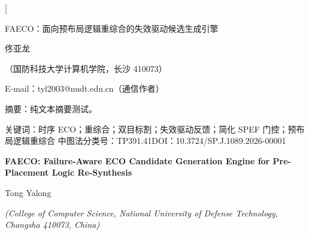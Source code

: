 \documentclass[twocolumn,10pt]{ctexart}
\begin{document}
\twocolumn[
\begin{center}
{\heiti{} FAECO：面向预布局逻辑重综合的失效驱动候选生成引擎}\par
\vspace{6pt}
{\fangsong{} 佟亚龙}\par
\vspace{4pt}
{\songti\fontsize{8}{12}\selectfont（国防科技大学计算机学院，长沙 410073）}\par\vspace{2pt}
{\songti\fontsize{8}{12}\selectfont E-mail：tyl2003@nudt.edu.cn（通信作者）}\par
\vspace{8pt}
\end{center}
\begin{flushleft}
{\heiti\fontsize{8.5}{13}\selectfont 摘\quad 要：}{\songti\fontsize{8.5}{13}\selectfont 纯文本摘要测试。}
\par
\vspace{4pt}
{\heiti\fontsize{8.5}{13}\selectfont 关键词：}{\songti\fontsize{8.5}{13}\selectfont 时序 ECO；重综合；双目标割；失效驱动反馈；简化 SPEF 门控；预布局逻辑重综合}
\vspace{2pt}
{\songti\fontsize{8.5}{13}\selectfont 中图法分类号：TP391.41\qquad DOI：10.3724/SP.J.1089.2026-00001}
\end{flushleft}
\vspace{6pt}
\begin{center}
{\bfseries\fontsize{13.5}{18}\selectfont FAECO: Failure-Aware ECO Candidate Generation Engine for Pre-Placement Logic Re-Synthesis}\par
\vspace{5pt}
{\normalsize Tong Yalong\par}
\vspace{3pt}
{\small \itshape (College of Computer Science, National University of Defense Technology, Changsha 410073, China)}\par
\vspace{6pt}
\end{center}
\end{document}
